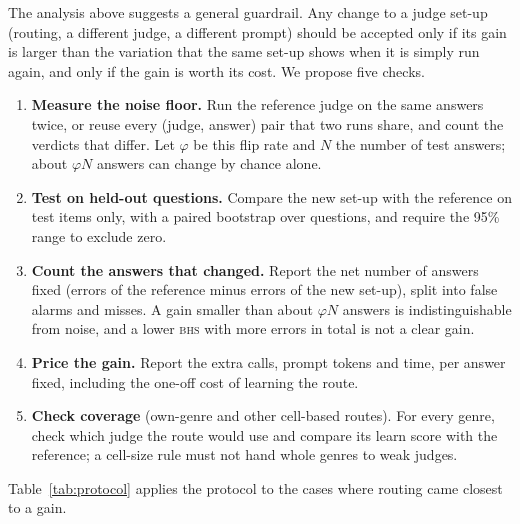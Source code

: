 \documentclass[11pt]{article}
\newcommand{\BHS}{\textsc{bhs}}
\begin{document}
The analysis above suggests a general guardrail. Any change to a judge set-up (routing, a different judge, a different
prompt) should be accepted only if its gain is larger than the variation that the same set-up shows when it is simply
run again, and only if the gain is worth its cost. We propose five checks.

\begin{enumerate}
  \item \textbf{Measure the noise floor.} Run the reference judge on the same answers twice, or reuse every
  (judge, answer) pair that two runs share, and count the verdicts that differ. Let $\varphi$ be this flip rate and
  $N$ the number of test answers; about $\varphi N$ answers can change by chance alone.
  \item \textbf{Test on held-out questions.} Compare the new set-up with the reference on test items only, with a
  paired bootstrap over questions, and require the 95\% range to exclude zero.
  \item \textbf{Count the answers that changed.} Report the net number of answers fixed (errors of the reference
  minus errors of the new set-up), split into false alarms and misses. A gain smaller than about $\varphi N$ answers
  is indistinguishable from noise, and a lower \BHS{} with more errors in total is not a clear gain.
  \item \textbf{Price the gain.} Report the extra calls, prompt tokens and time, per answer fixed, including the
  one-off cost of learning the route.
  \item \textbf{Check coverage} (own-genre and other cell-based routes). For every genre, check which judge the route
  would use and compare its learn score with the reference; a cell-size rule must not hand whole genres to weak judges.
\end{enumerate}

Table~\ref{tab:protocol} applies the protocol to the cases where routing came closest to a gain.
\end{document}
